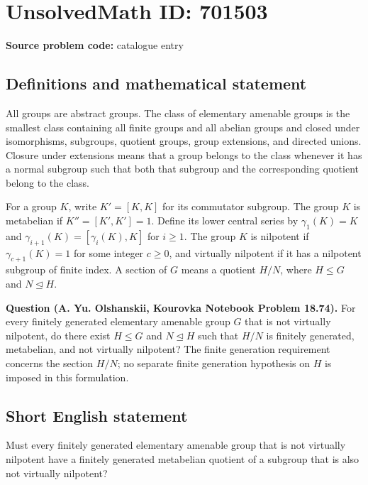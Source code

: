 \documentclass[11pt]{article}
\begin{document}
\section*{UnsolvedMath ID: 701503}
\textbf{Source problem code:} catalogue entry
\subsection{Definitions and mathematical statement}
All groups are abstract groups. The class of elementary amenable groups is the smallest class containing all finite groups and all abelian groups and closed under isomorphisms, subgroups, quotient groups, group extensions, and directed unions. Closure under extensions means that a group belongs to the class whenever it has a normal subgroup such that both that subgroup and the corresponding quotient belong to the class.

For a group \(K\), write \(K'=[K,K]\) for its commutator subgroup. The group \(K\) is metabelian if \(K''=[K',K']=1\). Define its lower central series by \(\gamma_1(K)=K\) and \(\gamma_{i+1}(K)=[\gamma_i(K),K]\) for \(i\geq 1\). The group \(K\) is nilpotent if \(\gamma_{c+1}(K)=1\) for some integer \(c\geq 0\), and virtually nilpotent if it has a nilpotent subgroup of finite index. A section of \(G\) means a quotient \(H/N\), where \(H\leq G\) and \(N\trianglelefteq H\).

\textbf{Question (A. Yu. Olshanskii, Kourovka Notebook Problem 18.74).} For every finitely generated elementary amenable group \(G\) that is not virtually nilpotent, do there exist \(H\leq G\) and \(N\trianglelefteq H\) such that \(H/N\) is finitely generated, metabelian, and not virtually nilpotent? The finite generation requirement concerns the section \(H/N\); no separate finite generation hypothesis on \(H\) is imposed in this formulation.
\subsection{Short English statement}
Must every finitely generated elementary amenable group that is not virtually nilpotent have a finitely generated metabelian quotient of a subgroup that is also not virtually nilpotent?
\end{document}
